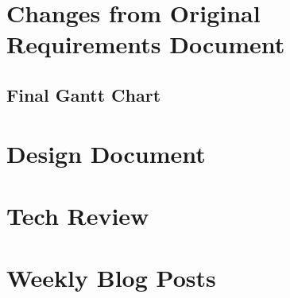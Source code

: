 \documentclass[10pt,letterpaper,onecolumn,draftclsnofoot]{IEEEtran}
\begin{document}
\section{Changes from Original Requirements Document}
\subsection{Final Gantt Chart}

\section{Design Document}

\section{Tech Review}

\section{Weekly Blog Posts}
\end{document}
